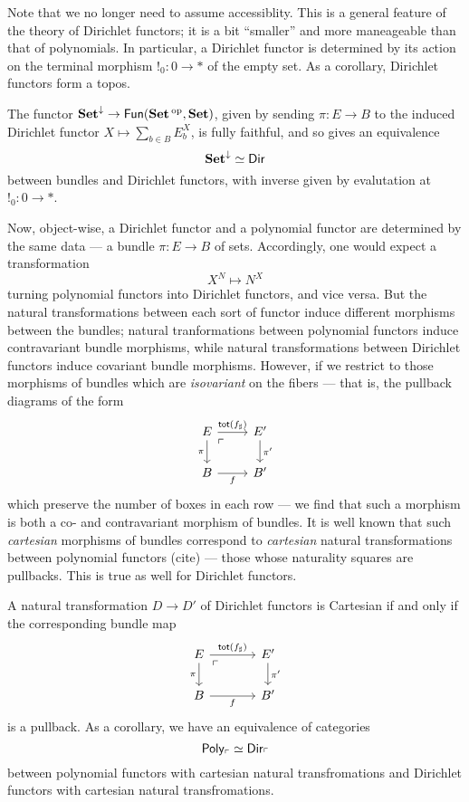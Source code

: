 Note that we no longer need to assume accessiblity. This is a general feature of
the theory of Dirichlet functors; it is a bit ``smaller'' and more maneageable
than that of polynomials. In particular, a Dirichlet functor is determined by
its action on the terminal morphism $!_0 : 0 \to \ast$ of the empty set. As a corollary, Dirichlet functors form a topos.

\begin{thm}\label{thm:dirichlet.set.equivalence}
The functor $\operatorname{\textbf{Set}}^{\mathbin{\downarrow}} \to \mathsf{{Fun}}(\operatorname{\textbf{Set}}\operatorname{^\text{op}}, \operatorname{\textbf{Set}})$, given by sending $\pi : E
\to B$ to the induced Dirichlet functor $X \mapsto \sum_{b \in B} E_b^X$, is
fully faithful, and so gives an equivalence
$$\operatorname{\textbf{Set}}^{\mathbin{\downarrow}} \simeq \operatorname{\mathsf{{Dir}}}$$
between bundles and Dirichlet functors, with inverse given by evalutation at
$!_0 : 0 \to \ast$.
\end{thm}


Now, object-wise, a Dirichlet functor and a polynomial functor are determined by
the same data --- a bundle $\pi : E \to B$ of sets. Accordingly, one would
expect a transformation
$$X^N \mapsto N^X$$
turning polynomial functors into Dirichlet functors, and vice versa. But the
natural transformations between each sort of functor induce different morphisms
between the bundles; natural tranformations between polynomial functors induce
contravariant bundle morphisms, while natural transformations between Dirichlet
functors induce covariant bundle morphisms. However, if we restrict to those
morphisms of bundles which are \emph{isovariant} on the fibers --- that is, the
pullback diagrams of the form
\[
  \begin{tikzcd}
E \arrow[r, "\term{tot}(f_{\sharp})"] \arrow[d, "\pi"'] \arrow[dr, phantom,
"\ulcorner" very near start] & E' \arrow[d, "\pi'"] \\
B \arrow[r, "f"']                                       & B'                  
\end{tikzcd}
\]
which preserve the number of boxes in each row --- we find that such a morphism
is both a co- and contravariant morphism of bundles. It is well known that such
\emph{cartesian} morphisms of bundles correspond to \emph{cartesian} natural
transformations between polynomial functors (cite) --- those whose naturality
squares are pullbacks. This is true as well for Dirichlet functors.
\begin{thm}
A natural transformation $D \to D'$ of Dirichlet functors is Cartesian if and
only if the corresponding bundle map
\[
  \begin{tikzcd}[column sep=large]
E \arrow[r, "\term{tot}(f_{\sharp})"] \arrow[d, "\pi"'] \arrow[dr, phantom,
"\ulcorner" very near start] & E' \arrow[d, "\pi'"] \\
B \arrow[r, "f"']                                       & B'                  
\end{tikzcd}
\]
is a pullback. As a corollary, we have an equivalence of categories
$$\mathsf{{Poly}}_{\ulcorner} \simeq \operatorname{\mathsf{{Dir}}}_{\ulcorner}$$
between polynomial functors with cartesian natural transfromations and Dirichlet
functors with cartesian natural transfromations.
\end{thm}

